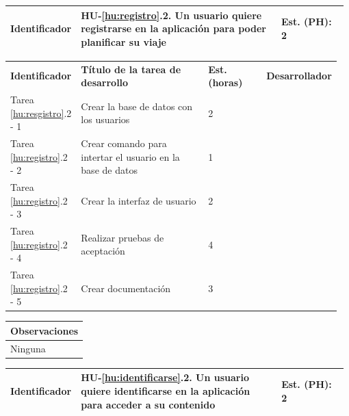 \documentclass[11pt]{article}
\begin{document}
\centering
\begin{longtable}{p{0.18\linewidth}|p{0.6\linewidth}|p{0.2\linewidth}}
	\toprule
	\toprule
	\textbf{Identificador} & \textbf{HU-\ref{hu:registro}.2}. Un usuario quiere registrarse en la aplicación para poder planificar su viaje & \textbf{Est. (PH):} 2 \\
	
	\bottomrule
\end{longtable}

\begin{longtable}{p{0.18\linewidth}|p{0.4\linewidth}|p{0.18\linewidth}|p{0.2\linewidth}}
	\toprule
	\textbf{Identificador} & \textbf{Título de la tarea de desarrollo} & \textbf{Est. (horas)} & \textbf{Desarrollador} \\
        Tarea \ref{hu:resgistro}.2 - 1 & Crear la base de datos con los usuarios & 2 &\\
        Tarea \ref{hu:registro}.2 - 2 & Crear comando para intertar el usuario en la base de datos & 1 & \\
        Tarea \ref{hu:registro}.2 - 3 & Crear la interfaz de usuario & 2 & \\
        Tarea \ref{hu:registro}.2 - 4 & Realizar pruebas de aceptación & 4 & \\
       	Tarea \ref{hu:registro}.2 - 5 & Crear documentación & 3 & \\
	\bottomrule
\end{longtable}





\begin{longtable}{p{1.028\linewidth}}
	\textbf{Observaciones}\\
	\midrule
	Ninguna\\
	\bottomrule
	\bottomrule
\end{longtable}


\centering
\begin{longtable}{p{0.18\linewidth}|p{0.6\linewidth}|p{0.2\linewidth}}
	\toprule
	\toprule
	\textbf{Identificador} & \textbf{HU-\ref{hu:identificarse}.2}. Un usuario quiere identificarse en la aplicación para acceder a su contenido & \textbf{Est. (PH):} 2 \\
	
	\bottomrule
\end{longtable}
\end{document}
